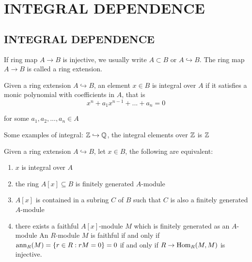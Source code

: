 \chapter{INTEGRAL DEPENDENCE}

\section{INTEGRAL DEPENDENCE}

\begin{remark}
	If ring map $A \to B$ is injective, we usually write $A \subset B$ or $A \hookrightarrow B$. The ring map $A \to B$ is called a ring extension.
\end{remark}

\begin{definition}[integral]
	Given a ring extension $A \hookrightarrow B$, an element $x \in B$ is integral over $A$ if it satisfies a monic polynomial with coefficients in $A$, that is
	$$
		x^n + a_1 x^{n-1} + ... + a_n = 0
	$$
	
	for some $a_1, a_2, ..., a_n \in A$
\end{definition}

\begin{remark}
	Some examples of integral: $\mathbb{Z} \hookrightarrow \mathbb{Q}$, the integral elements over $\mathbb{Z}$ is $\mathbb{Z}$
\end{remark}

\begin{proposition}
	Given a ring extension $A \hookrightarrow B$, let $x \in B$, the following are equivalent:
	\begin{enumerate}
		\item $x$ is integral over $A$
		
		\item the ring $A[x] \subseteq B$ is finitely generated $A$-module
		
		\item $A[x]$ is contained in a subring $C$ of $B$ such that $C$ is also a finitely generated $A$-module
		
		\item there exists a faithful $A[x]$-module $M$ which is finitely generated as an $A$-module
		An $R$-module $M$ is faithful if and only if $\operatorname{ann}_R(M) = \{r \in R: rM = 0\} = 0$ if and only if $R \to \operatorname{Hom}_R(M, M)$ is injective.
	\end{enumerate}
\end{proposition}

